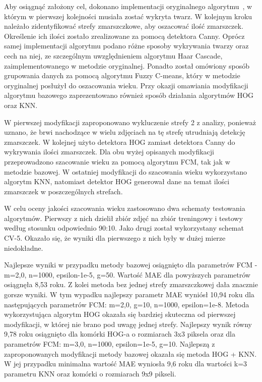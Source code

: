 \documentclass[a4paper,twoside,12pt]{book}
\begin{document}
    Aby osiągnąć założony cel, dokonano implementacji oryginalnego algorytmu~\cite{wrinkleFeatures},
    w którym w pierwszej kolejności musiała zostać wykryta twarz.
    W kolejnym kroku należało zidentyfikować strefy zmarszczkowe, aby oszacować ilość zmarszczek.
    Określenie ich ilości zostało zrealizowane za pomocą detektora Canny. Oprócz samej implementacji
    algorytmu podano różne sposoby wykrywania twarzy oraz cech na niej, ze szczególnym uwzględnieniem
    algorytmu Haar Cascade, zaimplementowanego w metodzie oryginalnej. Ponadto został omówiony sposób
    grupowania danych za pomocą algorytmu Fuzzy C-means, który w metodzie oryginalnej posłużył do oszacowania
    wieku. Przy okazji omawiania modyfikacji algorytmu bazowego zaprezentowano również sposób działania
    algorytmów HOG oraz KNN.

    W pierwszej modyfikacji zaproponowano wykluczenie strefy 2 z analizy, ponieważ uznano,
    że brwi nachodzące w wielu zdjęciach na tę strefę utrudniają detekcję zmarszczek.
    W kolejnej użyto detektora HOG zamiast detektora Canny do wykrywania ilości zmarszczek.
    Dla obu wyżej opisanych modyfikacji przeprowadzono szacowanie wieku za pomocą algorytmu FCM,
    tak jak w metodzie bazowej. W ostatniej modyfikacji do szacowania wieku wykorzystano algorytm KNN,
    natomiast detektor HOG generował dane na temat ilości zmarszczek w poszczególnych strefach.

    W celu oceny jakości szacowania wieku zastosowano dwa schematy testowania algorytmów.
    Pierwszy z nich dzielił zbiór zdjęć na zbiór treningowy i testowy według stosunku odpowiednio 90:10.
    Jako drugi został wykorzystany schemat CV-5. Okazało się, że wyniki dla pierwszego z nich były w dużej mierze
    niedokładne.

    Najlepsze wyniki w przypadku metody bazowej osiągnięto dla parametrów FCM - m=2,0, n=1000,
    epsilon-1e-5, g=50. Wartość MAE dla powyższych parametrów osiągnęła 8,53 roku.
    Z kolei metoda bez jednej strefy zmarszczkowej dała znacznie gorsze wyniki.
    W tym wypadku najlepszy parametr MAE wyniósł 10,94 roku dla następujących parametrów FCM: m=2,0, g=10, n=1000,
    epsilon=1e-8. Metoda wykorzystująca algorytm HOG okazała się bardziej skuteczna od pierwszej modyfikacji,
    w której nie brano pod uwagę jednej strefy. Najlepszy wynik równy 9,78 roku osiągnięto dla komórki
    HOG-a o rozmiarach 3x3 piksela oraz dla parametrów FCM: m=3,0, n=1000, epsilon=1e-5, g=10.
    Najlepszą z zaproponowanych modyfikacji metody bazowej okazała się metoda HOG + KNN.
    W jej przypadku minimalna wartość MAE wyniosła 9,6 roku dla wartości k=3 parametru KNN oraz komórki o rozmiarach 9x9 pikseli.
\end{document}
